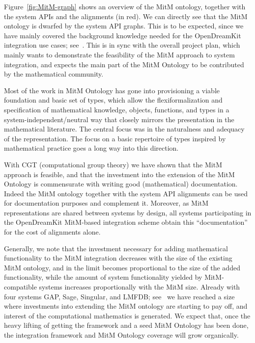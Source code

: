 Figure~\ref{fig:MitM-graph} shows an overview of the MitM ontology, together with the
system APIs and the alignments (in red). We can directly see that the MitM ontology is
dwarfed by the system API graphs. This is to be expected, since we have mainly covered the
background knowledge needed for the OpenDreamKit integration use cases;
see~\cite{ODK-D6.5}. This is in sync with the overall project plan, which mainly wants to
demonstrate the feasibility of the MitM approach to system integration, and expects the
main part of the MitM Ontology to be contributed by the mathematical community.

Most of the work in MitM Ontology has gone into provisioning a viable foundation
and basic set of types, which allow the flexiformalization and specification of
mathematical knowledge, objects, functions, and types in a system-independent/neutral way
that closely mirrors the presentation in the mathematical literature. The central focus
was in the naturalness and adequacy of the representation. The focus on a basic repertoire
of types inspired by mathematical practice goes a long way into this direction.

With CGT (computational group theory) we have shown that the MitM approach is feasible,
and that the investment into the extension of the MitM Ontology is commensurate with
writing good (mathematical) documentation. Indeed the MitM ontology together with the
system API alignments can be used for documentation purposes and complement it. Moreover, as
MitM representations are shared between systems by design, all systems participating in
the OpenDreamKit MitM-based integration scheme obtain this ``documentation'' for the cost
of alignments alone. 

Generally, we note that the investment necessary for adding mathematical functionality to
the MitM integration decreases with the size of the existing MitM ontology, and in the
limit becomes proportional to the size of the added functionality, while the amount of
system functionality yielded by MitM-compatible systems increases proportionally with the
MitM size. Already with four systems GAP, Sage, Singular, and LMFDB; see~\cite{ODK-D6.5}
we have reached a size where investments into extending the MitM ontology are starting to
pay off, and interest of the computational mathematics is generated. We expect that, once
the heavy lifting of getting the framework and a seed MitM Ontology has been done,
the integration framework and MitM Ontology coverage will grow organically.

